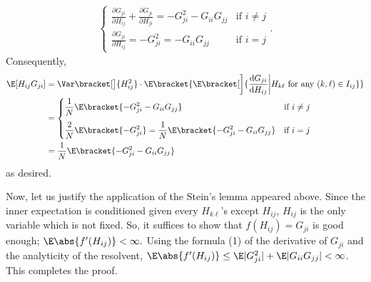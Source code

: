\documentclass{homework}
\begin{document}
{\begin{align*}
\begin{cases}
        \displaystyle\frac{\partial G_{ji}}{\partial H_{ij}} + \frac{\partial G_{ji}}{\partial H_{ji}} = -G_{ji}^2 - G_{ii}G_{jj} & \text{if }i\ne j \\[10pt]
        \displaystyle\frac{\partial G_{ji}}{\partial H_{ij}}               = -G_{ji}^2                    =-G_{ii}G_{jj}          & \text{if }i = j
    \end{cases}.\tag{1}
\end{align*}
Consequently,
\begin{align*}
    \E[H_{ij}G_{ji}] & = \Var\bracket[\big]{ H_{ij}^2 }\cdot  \E\bracket{ \E\bracket[\bigg]{ \frac{\mathrm d G_{ji}}{\mathrm d H_{ij}}\bigg|H_{k\ell}\text{ for any }(k,\ell)\in I_{ij} } }
    \\ &= \begin{cases}
        \displaystyle\frac 1N \E\bracket{ -G_{ji}^2-G_{ii}G_{jj} } & \text{if }i\ne j \\[10pt]
        \displaystyle\frac 2N \E\bracket{ -G_{ji}^2 } = \frac 1N \E\bracket{ -G_{ji}^2-G_{ii}G_{jj} } & \text{if }i = j
    \end{cases}
    \\ &= \frac 1N \E\bracket{ -G_{ji}^2-G_{ii}G_{jj} }
\end{align*}
as desired.

Now, let us justify the application of the Stein's lemma appeared above. Since the inner expectation is conditioned given every $H_{k\ell}$'s except $H_{ij}$, $H_{ij}$ is the only variable which is not fixed. So, it suffices to show that $f(H_{ij}) = G_{ji}$ is good enough; $\E\abs{f'(H_{ij})} < \infty.$ Using the formula (1) of the derivative of $G_{ji}$ and the analyticity of the resolvent, $\E\abs{f'(H_{ij})} \le \E|G_{ji}^2|+\E|G_{ii}G_{jj}|<\infty$. This completes the proof.
}
\end{document}
